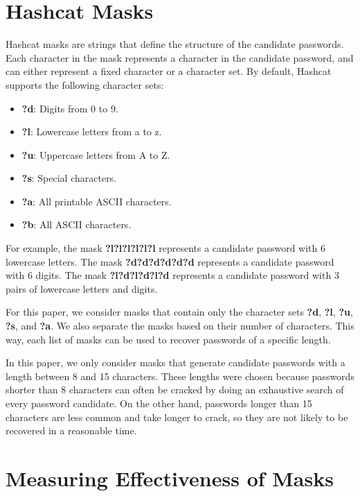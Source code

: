 \documentclass[sigconf,authordraft]{acmart}
\begin{document}
\section{Hashcat Masks}
\label{sec:hashcat_masks}

Hashcat masks are strings that define the structure of the candidate passwords.
Each character in the mask represents a character in the candidate password, and can either represent a fixed character or a character set.
By default, Hashcat supports the following character sets:

\begin{itemize}
  \item \textbf{?d}: Digits from 0 to 9.
  \item \textbf{?l}: Lowercase letters from a to z.
  \item \textbf{?u}: Uppercase letters from A to Z.
  \item \textbf{?s}: Special characters.
  \item \textbf{?a}: All printable ASCII characters.
  \item \textbf{?b}: All ASCII characters.
\end{itemize}

For example, the mask \textbf{?l?l?l?l?l?l} represents a candidate password with 6 lowercase letters.
The mask \textbf{?d?d?d?d?d?d} represents a candidate password with 6 digits.
The mask \textbf{?l?d?l?d?l?d} represents a candidate password with 3 pairs of lowercase letters and digits.

For this paper, we consider masks that contain only the character sets \textbf{?d}, \textbf{?l}, \textbf{?u}, \textbf{?s}, and \textbf{?a}.
We also separate the masks based on their number of characters.
This way, each list of masks can be used to recover passwords of a specific length.

In this paper, we only consider masks that generate candidate passwords with a length between 8 and 15 characters.
These lengths were chosen because passwords shorter than 8 characters can often be cracked by doing an exhaustive search of every password candidate.
On the other hand, passwords longer than 15 characters are less common and take longer to crack, so they are not likely to be recovered in a reasonable time.

\section{Measuring Effectiveness of Masks}
\end{document}
